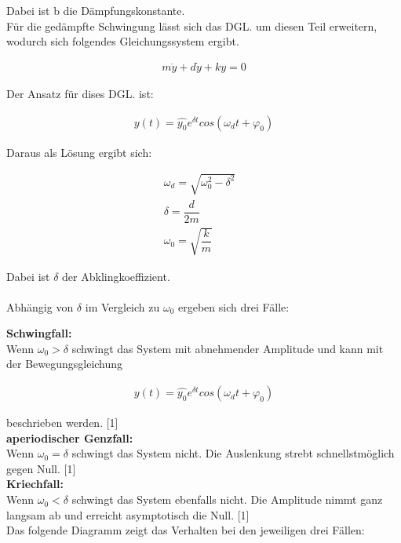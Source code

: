 \documentclass[a4paper]{scrartcl}
\numberwithin{equation}{subsection}
\begin{document}
Dabei ist b die Dämpfungskonstante. \\ 
Für die gedämpfte Schwingung lässt sich das DGL. um diesen Teil erweitern, wodurch sich folgendes Gleichungssystem ergibt.

\begin{align}
m \ddot{y} + d \dot{y} + k y = 0 
\end{align}

Der Ansatz für dises DGL. ist:

\begin{align}
y(t) = \widehat{y_0} e^{\delta t} cos(\omega_d t + \varphi_0)
\end{align}

Daraus als Lösung ergibt sich:

\begin{align}
\omega_d = \sqrt{\omega_0^2 - \delta^2} &\\
\delta = \dfrac{d}{2m} &\\
\omega_0 = \sqrt{\dfrac{k}{m}}
\end{align}

Dabei ist $\delta$ der Abklingkoeffizient. \\ \\

Abhängig von $\delta$ im Vergleich zu $\omega_0$ ergeben sich drei Fälle:

\textbf{Schwingfall:}\\
Wenn $\omega_0 > \delta$ schwingt das System mit abnehmender Amplitude und kann mit der Bewegungsgleichung

\begin{align}
y(t) = \widehat{y_0} e^{\delta t} cos(\omega_d t + \varphi_0)
\end{align}

beschrieben werden. [1]\\ 

\textbf{aperiodischer Genzfall:}\\
Wenn $\omega_0 = \delta$ schwingt das System nicht. Die Auslenkung strebt schnellstmöglich gegen Null. [1]\\

\textbf{Kriechfall:}\\
Wenn $\omega_0 < \delta$ schwingt das System ebenfalls nicht. Die Amplitude nimmt ganz langsam ab und erreicht asymptotisch die Null. [1]\\


Das folgende Diagramm zeigt das Verhalten bei den jeweiligen drei Fällen:

\end{document}
